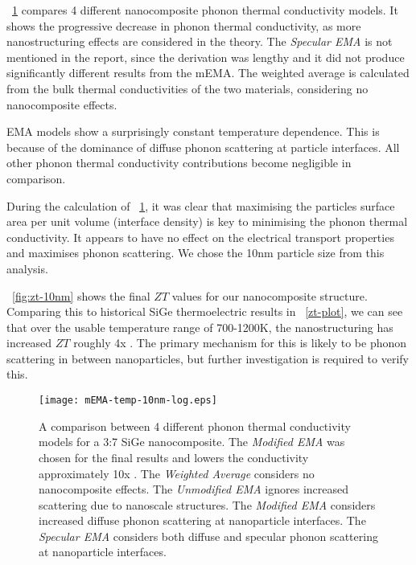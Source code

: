 \documentclass[12pt]{article}
\newcommand{\figref}[2][\figurename~]{#1\ref{#2}}
\newcommand{\tms}{\textsf{x} }
\begin{document}
\figref{fig:mEMA-temp-10nm-log} compares 4 different nanocomposite phonon thermal conductivity models. It shows the progressive decrease in phonon thermal conductivity, as more nanostructuring effects are considered in the theory. The \emph{Specular EMA} \cite{sema} is not mentioned in the report, since the derivation was lengthy and it did not produce significantly different results from the mEMA. The weighted average is calculated from the bulk thermal conductivities of the two materials, considering no nanocomposite effects. 

EMA models show a surprisingly constant temperature dependence. This is because of the dominance of diffuse phonon scattering at particle interfaces. All other phonon thermal conductivity contributions become negligible in comparison.

During the calculation of \figref{fig:mEMA-temp-10nm-log}, it was clear that maximising the particles surface area per unit volume (interface density) is key to minimising the phonon thermal conductivity. It appears to have no effect on the electrical transport properties and maximises phonon scattering. We chose the 10nm particle size from this analysis.


\figref{fig:zt-10nm} shows the final $ZT$ values for our nanocomposite structure. Comparing this to historical SiGe thermoelectric results in \figref{zt-plot}, we can see that over the usable temperature range of 700-1200K, the nanostructuring has increased $ZT$ roughly 4\tms. The primary mechanism for this is likely to be phonon scattering in between nanoparticles, but further investigation is required to verify this.

\begin{figure}
	\centering
	\texttt{[image: mEMA-temp-10nm-log.eps]}
	\caption{A comparison between 4 different phonon thermal conductivity models for a 3:7 SiGe nanocomposite. The \emph{Modified EMA} was chosen for the final results and lowers the conductivity approximately 10\tms. The \emph{Weighted Average} considers no nanocomposite effects. The \emph{Unmodified EMA} \cite{ema} ignores increased scattering due to nanoscale structures. The \emph{Modified EMA} \cite{mema} considers increased diffuse phonon scattering at nanoparticle interfaces. The \emph{Specular EMA} \cite{sema} considers both diffuse and specular phonon scattering at nanoparticle interfaces.}
	\label{fig:mEMA-temp-10nm-log}
\end{figure}
\end{document}
